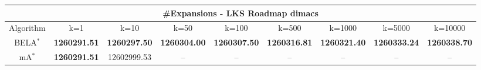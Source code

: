 \begin{tabular}{c|cccccccc}\toprule
\multicolumn{9}{c}{#Expansions - LKS Roadmap dimacs}\\ \midrule
Algorithm & k=1 & k=10 & k=50 & k=100 & k=500 & k=1000 & k=5000 & k=10000 \\ \midrule
BELA$^*$ & \textbf{1260291.51} & \textbf{1260297.50} & \textbf{1260304.00} & \textbf{1260307.50} & \textbf{1260316.81} & \textbf{1260321.40} & \textbf{1260333.24} & \textbf{1260338.70} \\
mA$^*$ & \textbf{1260291.51} & 12602999.53 & -- & -- & -- & -- & -- & -- \\ \bottomrule 
\end{tabular}

